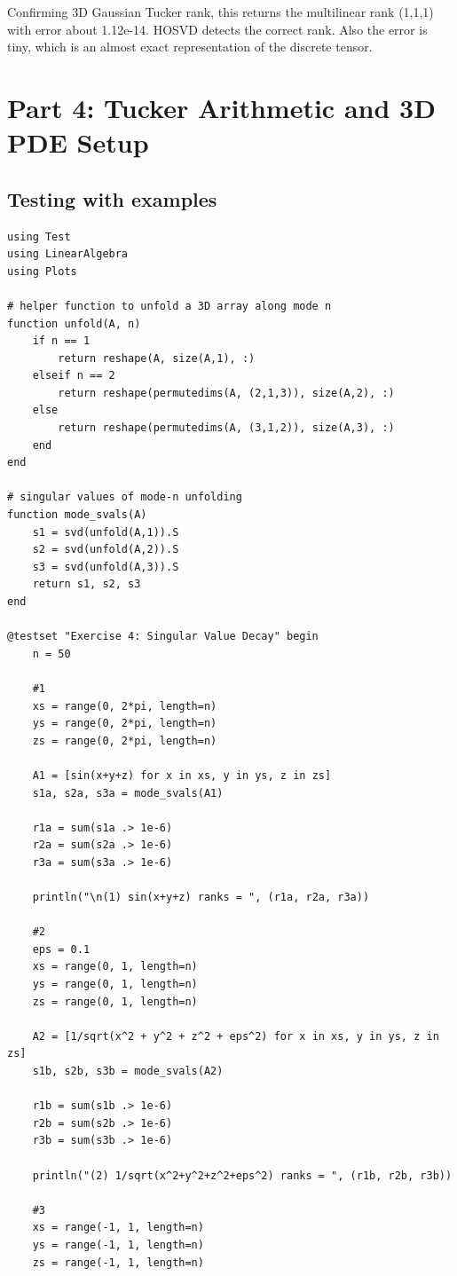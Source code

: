 \documentclass[11pt]{report}
\begin{document}
Confirming 3D Gaussian Tucker rank, this returns the multilinear rank (1,1,1) with error about 1.12e-14. HOSVD detects the correct rank. Also the error is tiny, which is an almost exact representation of the discrete tensor.


\section{Part 4: Tucker Arithmetic and 3D PDE Setup}

\subsection{Testing with examples}

\begin{lstlisting}
using Test
using LinearAlgebra
using Plots

# helper function to unfold a 3D array along mode n
function unfold(A, n)
    if n == 1
        return reshape(A, size(A,1), :)
    elseif n == 2
        return reshape(permutedims(A, (2,1,3)), size(A,2), :)
    else
        return reshape(permutedims(A, (3,1,2)), size(A,3), :)
    end
end

# singular values of mode-n unfolding
function mode_svals(A)
    s1 = svd(unfold(A,1)).S
    s2 = svd(unfold(A,2)).S
    s3 = svd(unfold(A,3)).S
    return s1, s2, s3
end

@testset "Exercise 4: Singular Value Decay" begin
    n = 50

    #1
    xs = range(0, 2*pi, length=n)
    ys = range(0, 2*pi, length=n)
    zs = range(0, 2*pi, length=n)

    A1 = [sin(x+y+z) for x in xs, y in ys, z in zs]
    s1a, s2a, s3a = mode_svals(A1)

    r1a = sum(s1a .> 1e-6)
    r2a = sum(s2a .> 1e-6)
    r3a = sum(s3a .> 1e-6)

    println("\n(1) sin(x+y+z) ranks = ", (r1a, r2a, r3a))

    #2
    eps = 0.1
    xs = range(0, 1, length=n)
    ys = range(0, 1, length=n)
    zs = range(0, 1, length=n)

    A2 = [1/sqrt(x^2 + y^2 + z^2 + eps^2) for x in xs, y in ys, z in zs]
    s1b, s2b, s3b = mode_svals(A2)

    r1b = sum(s1b .> 1e-6)
    r2b = sum(s2b .> 1e-6)
    r3b = sum(s3b .> 1e-6)

    println("(2) 1/sqrt(x^2+y^2+z^2+eps^2) ranks = ", (r1b, r2b, r3b))

    #3
    xs = range(-1, 1, length=n)
    ys = range(-1, 1, length=n)
    zs = range(-1, 1, length=n)


\end{lstlisting}
\end{document}
